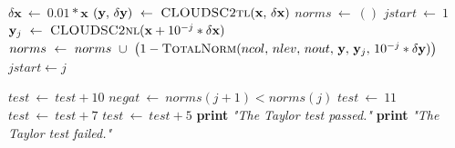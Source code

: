 \documentclass[gmd,manuscript,online]{copernicus}
\theoremstyle{theorem}
\theoremstyle{definition}
\theoremstyle{remark}
\theoremstyle{proposition}
\begin{document}
\begin{algorithm}[t!]
\begin{algorithmic}[1]
			\Statex

			 

			\State $\delta \mathbf{x} ~ \gets ~ 0.01 * \mathbf{x}$
			\State $\left( \mathbf{y}, \, \delta \mathbf{y} \right) ~ \gets ~ \Call{CLOUDSC2tl}{\mathbf{x}, \, \delta \mathbf{x}}$ 
			\State $norms ~ \gets ~ ()$
			\State $jstart ~ \gets ~ 1$
				\State $\mathbf{y}_j ~ \gets ~ \Call{CLOUDSC2nl}{\mathbf{x} + 10^{-j} * \delta \mathbf{x}}$
				\State $norms ~ \gets ~ norms ~ \cup ~ \left( 1 - \Call{TotalNorm}{ncol, \, nlev, \, nout, \, \mathbf{y}, \, \mathbf{y}_j, \, 10^{-j} * \delta \mathbf{y}} \right)$
					\State $jstart \gets j$
				\EndIf
			\EndFor

					\State $test ~ \gets ~ test + 10$
				\EndIf
				\State $negat ~ \gets ~ norms(j+1) < norms(j)$
			\EndFor
				\State $test ~ \gets ~ 11$
			\EndIf
				\State $test ~ \gets ~ test + 7$
			\EndIf
				\State $test ~ \gets ~ test + 5$
			\EndIf
				\State \textbf{print} \emph{"The Taylor test passed."}
			\Else
				\State \textbf{print} \emph{"The Taylor test failed."}
			\EndIf
			\EndProcedure
		\end{algorithmic}
	\end{algorithm}
\end{document}
